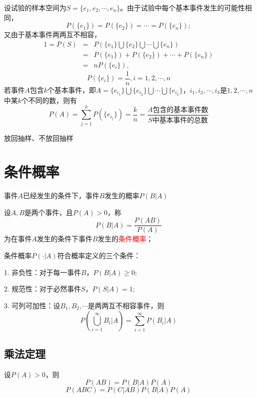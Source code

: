 \documentclass[12pt,a4paper]{article}
\begin{document}
设试验的样本空间为$S = \{e_1, e_2, \cdots, e_n\}$。由于试验中每个基本事件发生的可能性相同，
\begin{equation}
P(\{e_1\}) = P(\{e_2\}) = \cdots = P(\{e_n\});
\end{equation}
又由于基本事件两两互不相容，
\begin{eqnarray}
\nonumber 1 = P(S) &=& P(\{e_1\} \bigcup \{e_2\} \bigcup \cdots \bigcup \{e_n\}) \\
\nonumber &=& P(\{e_1\}) +P(\{e_2\}) + \cdots +P(\{e_n\}) \\ 
\nonumber &=& nP(\{e_i\}),
\end{eqnarray}
\begin{equation}
\nonumber P(\{e_i\}) = \frac{1}{n}, i = 1, 2, \cdots, n
\end{equation}
若事件$A$包含$k$个基本事件，即$A = \{e_{i_1}\} \bigcup \{e_{i_2}\} \bigcup \cdots \bigcup \{e_{i_k}\}$，$i_1, i_2, \cdots, i_k$是$1, 2, \cdots, n$中某$k$个不同的数，则有
\begin{equation}
P(A) = \sum_{j = 1}^k P(\{e_{i_j}\}) = \frac{k}{n} = \frac{A\text{包含的基本事件数}}{S\text{中基本事件的总数}}
\end{equation}

放回抽样、不放回抽样




\section{条件概率}
事件$A$已经发生的条件下，事件$B$发生的概率$P(B|A)$


设$A, B$是两个事件，且$P(A) > 0$，称
\begin{equation}
P(B|A) = \frac{P(AB)}{P(A)}
\end{equation}
为在事件$A$发生的条件下事件$B$发生的\textcolor{red}{条件概率}；

条件概率$P(\cdot|A)$符合概率定义的三个条件：

1. 非负性：对于每一事件$B$，$P(B|A) \geqslant 0$;

2. 规范性：对于必然事件$S$，$P(S|A) = 1$;

3. 可列可加性：设$B_1, B_2, \cdots$是两两互不相容事件，则
\begin{equation}
P\left(\bigcup_{i=1}^{\infty} B_i|A \right) = \sum_{i=1}^{\infty} P(B_i|A)
\end{equation}

\subsection{乘法定理}
设$P(A) > 0$，则
\begin{equation}
P(AB) = P(B|A) P(A)
\end{equation}
\begin{equation}
P(ABC) = P(C|AB) P(B|A) P(A)
\end{equation}
\end{document}

